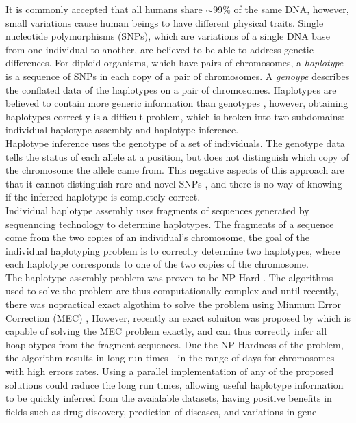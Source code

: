 \documentclass[10pt,twocolumn]{witseiepaper}
\begin{document}
It is commonly accepted that all humans share $\mathtt{\sim}$99$\%$ of the same DNA, however, small variations 
cause human beings to have different physical traits. Single nucleotide polymorphisms (SNPs), which are
variations of a single DNA base from one individual to another, are believed to be able to address
genetic differences. For diploid organisms, which have pairs of chromosomes, a \textit{haplotype} is a 
sequence of SNPs in each copy of a pair of chromosomes. A \textit{genoype} describes the conflated data of the
haplotypes on a pair of chromosomes. Haplotypes are believed to contain more generic information than
genotypes \cite{stephens:2001}, however, obtaining haplotypes correctly is a difficult problem, which is 
broken into two subdomains: individual haplotype assembly and haplotype inference. \\
Haplotype inference uses the genotype of a set of individuals. The genotype data tells the status of each
allele at a position, but does not distinguish which copy of the chromosome the allele came from.
This negative aspects of this approach are that it cannot distinguish rare and novel SNPs \cite{he:2010}, 
and there is no way of knowing if the inferred haplotype is completely correct. \\
Individual haplotype assembly uses fragments of sequences generated by sequenncing technology to determine
haplotypes. The fragments of a sequence come from the two copies of an individual's chromosome, the goal of the
individual haplotyping problem is to correctly determine two haplotypes, where each haplotype corresponds to
one of the two copies of the chromosome. \\
The haplotype assembly problem was proven to be NP-Hard \cite{lippert:2002}. The algorithms used to solve the
problem are thus computationally complex and until recently, there was nopractical exact algothim to solve 
the problem using Minmum Error Correction (MEC) \cite{bonizzoni:2003},
However, recently an exact soluiton was proposed by \cite{chen:2013} which is capable of solving the MEC 
problem exactly, and can thus correctly infer all hoaplotypes from the fragment sequences. Due the NP-Hardness 
of the problem, the algorithm results in long run times - in the range of days for chromosomes with high
errors rates. Using a parallel implementation of any of the proposed solutions could raduce the long run
times, allowing useful haplotype information to be quickly inferred from the avaialable datasets, having
positive benefits in fields such as drug discovery, prediction of diseases, and variations in gene
\end{document}

